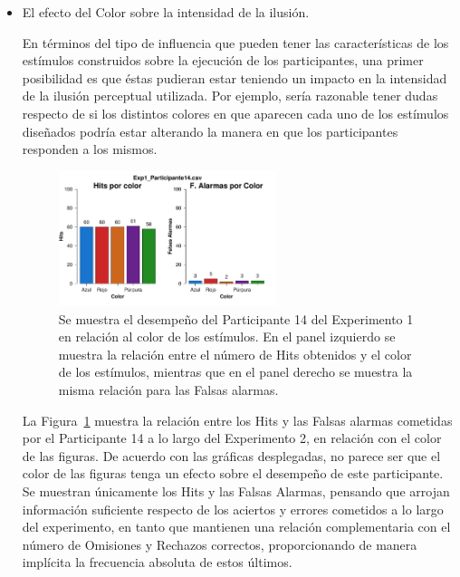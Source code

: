 \begin{itemize}
\item El efecto del Color sobre la intensidad de la ilusión.

En términos del tipo de influencia que pueden tener las características de los estímulos construidos sobre la ejecución de los participantes, una primer posibilidad es que éstas pudieran estar teniendo un impacto en la intensidad de la ilusión perceptual utilizada. Por ejemplo, sería razonable tener dudas respecto de si los distintos colores en que aparecen cada uno de los estímulos diseñados podría estar alterando la manera en que los participantes responden a los mismos.\\ 

\begin{figure}[th]
\centering
\includegraphics[width=0.60\textwidth]{Figures/Color_Exp1_P14}
\caption[Hits y Falsas Alarmas por Color; Ejemplo]{Se muestra el desempeño del Participante 14 del Experimento 1 en relación al color de los estímulos. En el panel izquierdo se muestra la relación entre el número de Hits obtenidos y el color de los estímulos, mientras que en el panel derecho se muestra la misma relación para las Falsas alarmas.}
\label{fig:Color_E2_P14}
\end{figure}

La Figura~\ref{fig:Color_E2_P14} muestra la relación entre los Hits y las Falsas alarmas cometidas por el Participante 14 a lo largo del Experimento 2, en relación con el color de las figuras. De acuerdo con las gráficas desplegadas, no parece ser que el color de las figuras tenga un efecto sobre el desempeño de este participante. Se muestran únicamente los Hits y las Falsas Alarmas, pensando que arrojan información suficiente respecto de los aciertos y errores cometidos a lo largo del experimento, en tanto que mantienen una relación complementaria con el número de Omisiones y Rechazos correctos, proporcionando de manera implícita la frecuencia absoluta de estos últimos.\\


\end{itemize}

